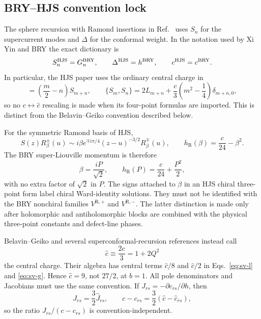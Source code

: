 \documentclass[11pt]{article}
\newcommand{\R}{\mathrm{R}}
\newcommand{\cH}{\widehat c}
\begin{document}
\subsection{BRY--HJS convention lock}
\label{sec:bry-hjs-dictionary}

The sphere recursion with Ramond insertions in
Ref.~\cite{HadaszJaskolskiSuchanek2008RamondBlocks} uses $S_n$ for the
supercurrent modes and $\Delta$ for the conformal weight.  In the notation
used by Xi Yin and BRY the exact dictionary is
\begin{equation}
 S_n^{\rm HJS}=G_n^{\rm BRY},\qquad
 \Delta^{\rm HJS}=h^{\rm BRY},\qquad
 c^{\rm HJS}=c^{\rm BRY}.
 \label{eq:bry-hjs-dictionary}
\end{equation}
In particular, the HJS paper uses the ordinary central charge in
\begin{equation}
 [L_m,S_n]=\left(\frac m2-n\right)S_{m+n},\qquad
 \{S_m,S_n\}=2L_{m+n}
 +\frac c3\left(m^2-\frac14\right)\delta_{m+n,0},
 \label{eq:hjs-algebra}
\end{equation}
so no $c\leftrightarrow\widehat c$ rescaling is made when its four-point
formulas are imported.  This is distinct from the Belavin--Geiko convention
described below.

For the symmetric Ramond basis of HJS,
\begin{equation}
 S(z)R_\beta^\pm(u)
 \sim i\beta e^{\mp i\pi/4}(z-u)^{-3/2}R_\beta^\mp(u),
 \qquad
 h_\R(\beta)=\frac c{24}-\beta^2.
 \label{eq:hjs-r-ope}
\end{equation}
The BRY super-Liouville momentum is therefore
\begin{equation}
 \beta=\frac{iP}{\sqrt2},\qquad
 h_\R(P)=\frac c{24}+\frac{P^2}{2},
 \label{eq:hjs-bry-beta}
\end{equation}
with no extra factor of $\sqrt2$ in $P$.  The signs attached to $\beta$ in
an HJS chiral three-point form label chiral Ward-identity solutions.  They
must not be identified with the BRY nonchiral families $V^{\R,+}$ and
$V^{\R,-}$.  The latter distinction is made only after holomorphic and
antiholomorphic blocks are combined with the physical three-point constants
and defect-line phases.

Belavin--Geiko and several superconformal-recursion references instead call
\begin{equation}
 \cH\equiv\frac{2c}{3}=1+2Q^2
 \label{eq:chat}
\end{equation}
the central charge.  Their algebra has central terms $\cH/8$ and $\cH/2$ in
Eqs.~\eqref{eq:sv-l} and \eqref{eq:sv-g}.  Hence $\cH=9$, not $27/2$, at
$b=1$.  All pole denominators and Jacobians must use the same convention.  If
$J_{rs}=-\partial c_{rs}/\partial h$, then
\begin{equation}
 J_{rs}=\frac32\widehat J_{rs},
 \qquad c-c_{rs}=\frac32(\cH-\cH_{rs}),
 \label{eq:j-conversion}
\end{equation}
so the ratio $J_{rs}/(c-c_{rs})$ is convention-independent.
\end{document}
